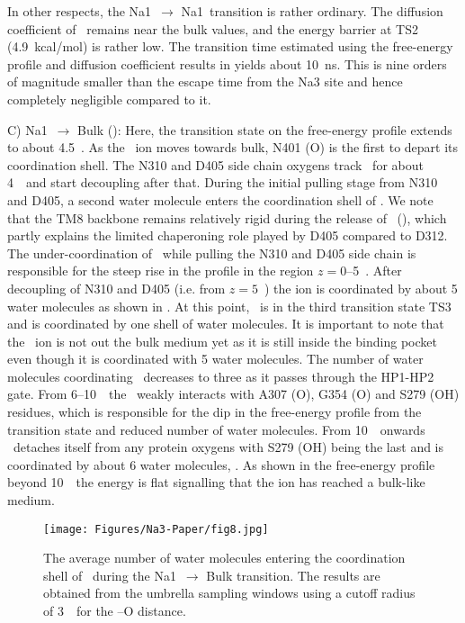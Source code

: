 In other respects, the Na1\prim\ $\rightarrow$ Na1\dprim\ transition is rather ordinary. The 
diffusion coefficient of \Na\ remains near the bulk values, and the energy barrier at TS2 
(4.9~kcal/mol) is rather low. The transition time estimated using the free-energy profile and 
diffusion coefficient results in  yields about 10~ns. This is nine orders of 
magnitude smaller than the escape time from the Na3 site and hence completely negligible 
compared to it.

C) Na1\dprim\ $\rightarrow$ Bulk (): Here, the transition state on the free-energy 
profile extends to about 4.5~\angs. As the \Na\ ion moves towards bulk, N401 (O) is the first to depart 
its coordination shell. The N310 and D405 side chain oxygens track \Na\ for about 4~\angs\ and 
start decoupling after that. During the initial pulling stage from N310 and D405, a second water 
molecule enters the coordination shell of \Na. We note that the TM8 backbone remains relatively 
rigid during the release of \Na\ (), which partly explains the limited chaperoning 
role played by D405 compared to D312. The under-coordination of \Na\ while pulling the N310 and D405 
side chain is responsible for the steep rise in the profile in the region $z=0$--5~\angs. After decoupling 
of N310 and D405 (i.e. from $z=5$~\angs) the ion is coordinated by about 5 water molecules as shown 
in . At this point, \Na\ is in the third transition state TS3 and is coordinated by 
one shell of water molecules. It is important to note that the \Na\ ion is not out the bulk medium yet 
as it is still inside the binding pocket even though it is coordinated with 5 water molecules. The 
number of water molecules coordinating \Na\ decreases to three as it passes through the HP1-HP2 gate. 
From 6--10~\angs\ the \Na\ weakly interacts with A307 (O), G354 (O) and S279 (OH) residues, which is 
responsible for the dip in the free-energy profile from the transition state and reduced number of water 
molecules. From 10~\angs\ onwards \Na\ detaches itself from any protein oxygens with S279 (OH) being 
the last and is coordinated by about 6 water molecules, . As shown in the free-energy 
profile beyond 10~\angs\ the energy is flat signalling that the ion has reached a bulk-like medium. 

\begin{figure}[t!]
\centering
 \texttt{[image: Figures/Na3-Paper/fig8.jpg]}
 \caption{The average number of water molecules entering the coordination shell of \Na\ 
          during the Na1\dprim\ $\rightarrow$ Bulk transition. The results are obtained 
          from the umbrella sampling windows using a cutoff radius of 3~\angs\ for 
          the \Na--O distance.}
\label{na3:fig8}
\end{figure}

